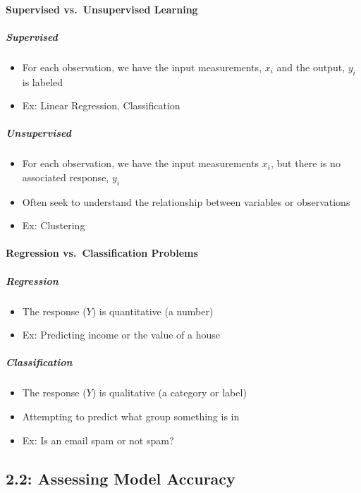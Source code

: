 \paragraph{Supervised vs.~Unsupervised Learning}\label{supervised-vs.-unsupervised-learning}

\subparagraph{Supervised}

\begin{itemize}
\tightlist
\item  For each observation, we have the input measurements, \(x_i\) and the  output, \(y_i\) is labeled
\item  Ex: Linear Regression, Classification
  \end{itemize}
  
   \subparagraph{Unsupervised}
   \begin{itemize}
       \tightlist
\item  For each observation, we have the input measurements \(x_i\), but  there is no associated response, \(y_i\)
\item  Often seek to understand the relationship between variables or  observations
\item  Ex: Clustering
\end{itemize}

\paragraph{Regression vs.~Classification Problems}\label{regression-vs.-classification-problems}

\subparagraph{Regression}\label{regression}

\begin{itemize}
\tightlist
\item  The response (\(Y\)) is quantitative (a number)
\item  Ex: Predicting income or the value of a house 
\end{itemize}
\subparagraph{Classification}
\begin{itemize}
\tightlist
\item  The response (\(Y\)) is qualitative (a category or label)
\item  Attempting to predict what group something is in
\item  Ex: Is an email spam or not spam?
\end{itemize}

\subsection*{2.2: Assessing Model Accuracy}\label{assessing-model-accuracy}


